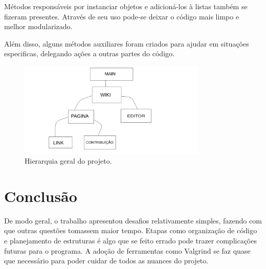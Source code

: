\documentclass[
	12pt,
	oneside,
	a4paper,
	english,
	french,
	spanish,
	brazil,
	]{abntex2}
\begin{document}
Métodos responsáveis por instanciar objetos e adicioná-los à listas também se
fizeram presentes. Através de seu uso pode-se deixar o código mais limpo e
melhor modularizado.

Além disso, alguns métodos auxiliares foram criados para ajudar em situações
especificas, delegando ações a outras partes do código.

\begin{figure}[h]
    \centering
    \includegraphics[width=0.8\textwidth]{estrutura.png}
    \caption{Hierarquia geral do projeto.}
    \label{img:hierarquia}
\end{figure}

\chapter{Conclusão}
De modo geral, o trabalho apresentou desafios relativamente simples, fazendo
com que outras questões tomassem maior tempo. Etapas como organização de código
e planejamento de estruturas é algo que se feito errado pode trazer
complicações futuras para o programa. A adoção de ferramentas como Valgrind se
faz quase que necessário para poder cuidar de todos as nuances do projeto.



\end{document}
